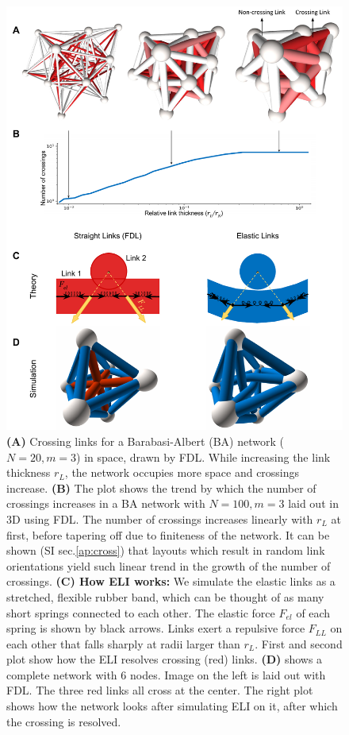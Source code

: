 \documentclass[nofootinbib,preprint,floatfix,titlepage,endfloats,superscriptaddress]{revtex4} %
\begin{document}
{\begin{figure}
{    }     
    \label{fig:crossings}
\end{figure}
\begin{figure}
    \vspace{4cm}
    \centering
    \includegraphics[width=.9\columnwidth]{fig-09-19/crs-resolve-0617.pdf}
    \caption{\scriptsize
    {\bf (A)}  Crossing links for a Barabasi-Albert (BA) network ($N = 20, m = 3$) in space, drawn by FDL. While increasing the link thickness $r_L$, the network occupies more space and crossings increase. 
    {\bf (B)} The plot shows the trend by which the number of crossings increases in a BA network with $N=100, m =3$ laid out in 3D using FDL.
    The number of crossings increases linearly with $r_L$ at first, before tapering off due to finiteness of the network. It can be shown (SI sec.\ref{ap:cross}) that layouts which result in random link orientations yield such linear trend in the growth of the number of crossings.
    {\bf(C) How ELI works:} We simulate the elastic links as a stretched, flexible rubber band, which can be thought of as many short springs connected to each other. 
    The elastic force $F_{el}$ of each spring is shown by black arrows.
    Links exert a repulsive force $F_{LL}$  on each other that falls sharply at radii larger than $r_L$. 
    First and second plot show how the ELI resolves crossing (red) links. {\bf(D)} shows a complete network with 6 nodes. Image on the left is laid out with FDL. The three red links all cross at the center. The right plot shows how the network looks after simulating ELI on it, after which the crossing is resolved. 
    }     
    \label{fig:crossings}
\end{figure}
} %
\end{document}
